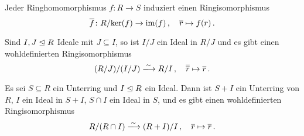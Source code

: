 \begin{corollary}[1.\ Isomorphiesatz]
  Jeder Ringhomomorphismus $f \colon R \to S$ induziert einen Ringisomorphismus
  \[
            \overline{f}
    \colon  R/{\ker(f)}
    \to     \operatorname{im}(f) \,,
    \quad   \overline{r}
    \mapsto f(r) \,.
  \]
\end{corollary}

\begin{corollary}[2.\ Isomorphiesatz]
  Sind $I, J \mathrel{\trianglelefteq} R$ Ideale mit $J \subseteq I$, so ist $I/J$ ein Ideal in $R/J$ und es gibt einen wohldefinierten Ringisomorphismus
  \[
                            (R/J)/(I/J)
    \xlongrightarrow{\sim}  R/I \,,
    \quad                   \class{\class{r}}
    \mapsto                 \class{r} \,.
  \]

\end{corollary}

\begin{corollary}[3.\ Isomorphiesatz]
  Es sei $S \subseteq R$ ein Unterring und $I \mathrel{\trianglelefteq} R$ ein Ideal.
  Dann ist $S + I$ ein Unterring von $R$, $I$ ein Ideal in $S + I$, $S \cap I$ ein Ideal in $S$, und es gibt einen wohldefinierten Ringisomorphismus
  \[
                            R/(R \cap I)
    \xlongrightarrow{\sim}  (R + I)/I \,,
    \quad                   \class{r}
    \mapsto                 \class{r} \,.
  \]
\end{corollary}

